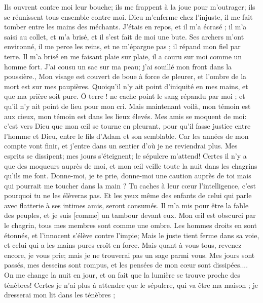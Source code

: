 \begin{multicols}{2}
{Ils ouvrent contre moi leur bouche; ils me frappent à la joue pour m'outrager; ils se réunissent tous ensemble contre moi. 
Dieu m'enferme chez l'injuste, il me fait tomber entre les mains des méchants. 
J'étais en repos, et il m'a écrasé ; il m'a saisi au collet, et m'a brisé, et il s'est fait de moi une bute.
Ses archers m'ont environné, il me perce les reins, et ne m'épargne pas ; il répand mon fiel par terre. 
Il m'a brisé en me faisant plaie sur plaie, il a couru sur moi comme un homme fort.
J'ai cousu un sac sur ma peau; j'ai souillé mon front dans la poussière.,
Mon visage est couvert de boue à force de pleurer, et l'ombre de la mort est sur mes paupières.  
Quoiqu'il n'y ait point d'iniquité en mes mains, et que ma prière soit pure.
Ô terre ! ne cache point le sang répandu par moi ; et qu'il n'y ait point de lieu pour mon cri.
Mais maintenant voilà, mon témoin est aux cieux, mon témoin est dans les lieux élevés.
Mes amis se moquent de moi: c'est vers Dieu que mon œil se tourne en pleurant,
pour qu'il fasse justice entre l'homme et Dieu, entre le fils d'Adam et son semblable.
Car les années de mon compte vont finir, et j'entre dans un sentier d'où je ne reviendrai plus. 
\VerseOne{}Mes esprits se dissipent; mes jours s'éteignent; le sépulcre m'attend! 
Certes il n'y a que des moqueurs auprès de moi, et mon œil veille toute la nuit dans les chagrins qu'ils me font.
Donne-moi, je te prie, donne-moi une caution auprès de toi mais qui pourrait me toucher dans la main ?
Tu caches à leur cœur l'intelligence, c'est pourquoi tu ne les élèveras pas.
Et les yeux même des enfants de celui qui parle avec flatterie à ses intimes amis, seront consumés.
Il m'a mis pour être la fable des peuples, et je suis [comme] un tambour devant eux.
Mon œil est obscurci par le chagrin, tous mes membres sont comme une ombre.
Les hommes droits en sont étonnés, et l'innocent s'élève contre l'impie;
Mais le juste tient ferme dans sa voie, et celui qui a les mains pures croît en force. 
Mais quant à vous tous, revenez encore, je vous prie; mais je ne trouverai pas un sage parmi vous. 
Mes jours sont passés, mes desseins sont rompus, et les pensées de mon cœur sont dissipées.... 
On me change la nuit en jour, et on fait que la lumière se trouve proche des ténèbres! 
Certes je n'ai plus à attendre que le sépulcre, qui va être ma maison ; je dresserai mon lit dans les ténèbres ;
}
\end{multicols}

